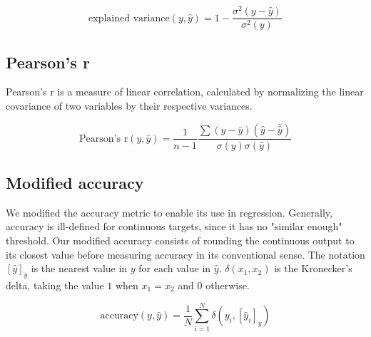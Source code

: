         $$ \text{explained variance}(y, \hat{y}) = 1 - \frac{\sigma^2(y - \hat{y})}{\sigma^2(y)}$$
    
    \subsection{Pearson's r}
        Pearson's r is a measure of linear correlation, calculated by normalizing the linear covariance of two variables by their respective variances. 
        
        $$
        \text{Pearson's r}(y, \hat{y}) = 
        \frac{1}{n-1}\frac{\sum{(y - \bar{y})(\hat{y} - \bar{\hat{y}})}}
             {\sigma(y)\sigma{(\hat{y})}}
        $$
    
    \subsection{Modified accuracy}
        We modified the accuracy metric to enable its use in regression. Generally, accuracy is ill-defined for continuous targets, since it has no "similar enough" threshold. Our modified accuracy consists of rounding the continuous output to its closest value before measuring accuracy in its conventional sense. The notation $[\hat{y}]_y$ is the nearest value in $y$ for each value in $\hat{y}$. $\delta(x_1, x_2)$ is the Kronecker's delta, taking the value $1$ when $x_1 = x_2$ and $0$ otherwise. 
        
        $$
        \text{accuracy}(y, \hat{y}) = \frac{1}{N}\sum_{i=1}^{N}{\delta(y_i, [\hat{y}_i]_y)}
        $$
        
        
        
        
        